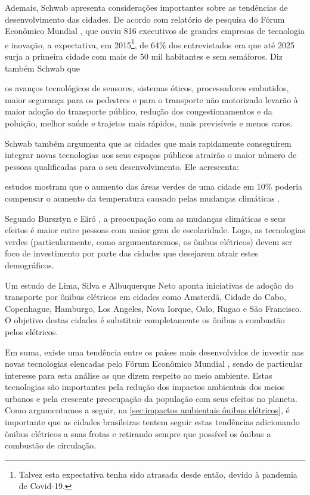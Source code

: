 Ademais, Schwab \cite{SCHWAB:19} apresenta considerações importantes sobre as tendências de desenvolvimento das cidades. De acordo com relatório de pesquisa do Fórum Econômico Mundial \cite{FEM:15}, que ouviu 816 executivos de grandes empresas de tecnologia e inovação, a expectativa, em 2015\footnote{Talvez esta expectativa tenha sido atrasada desde então, devido à pandemia de Covid-19.}, de 64\% dos entrevistados era que até 2025 surja a primeira cidade com mais de 50 mil habitantes e sem semáforos. Diz também Schwab que

\begin{displayquote}
    \textelp{} os avanços tecnológicos de sensores, sistemas óticos, processadores embutidos, maior segurança para os pedestres e para o transporte não motorizado levarão à maior adoção do transporte público, redução dos congestionamentos e da poluição, melhor saúde e trajetos mais rápidos, mais previsíveis e menos caros.
\end{displayquote}

Schwab também argumenta que as cidades que mais rapidamente conseguirem integrar novas tecnologias aos seus espaços públicos atrairão o maior número de pessoas qualificadas para o seu desenvolvimento. Ele acrescenta:

\begin{displayquote}
    \textelp{} estudos mostram que o aumento das áreas verdes de uma cidade em 10\% poderia compensar o aumento da temperatura causado pelas mudanças climáticas \textelp{}.
\end{displayquote}

Segundo Bursztyn e Eiró \cite{BURSZTYN:15}, a preocupação com as mudanças climáticas e seus efeitos é maior entre pessoas com maior grau de escolaridade. Logo, as tecnologias verdes (particularmente, como argumentaremos, os ônibus elétricos) devem ser foco de investimento por parte das cidades que desejarem atrair estes demográficos.

Um estudo de Lima, Silva e Albuquerque Neto \cite{LIMA:19} aponta iniciativas de adoção do transporte por ônibus elétricos em cidades como Amsterdã, Cidade do Cabo, Copenhague, Hamburgo, Los Angeles, Nova Iorque, Oslo, Rugao e São Francisco. O objetivo destas cidades é substituir completamente os ônibus a combustão pelos elétricos.

Em suma, existe uma tendência entre os países mais desenvolvidos de investir nas novas tecnologias elencadas pelo Fórum Econômico Mundial \cite{FEM:15}, sendo de particular interesse para esta análise as que dizem respeito ao meio ambiente. Estas tecnologias são importantes pela redução dos impactos ambientais dos meios urbanos e pela crescente preocupação da população com seus efeitos no planeta. Como argumentamos a seguir, na \cref{sec:impactos ambientais ônibus elétricos}, é importante que as cidades brasileiras tentem seguir estas tendências adicionando ônibus elétricos a suas frotas e retirando sempre que possível os ônibus a combustão de circulação.

